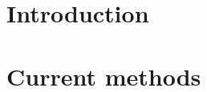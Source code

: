 \documentclass[review]{elsarticle}
\begin{document}
\newcommand{\RadioCoeffCresponse}{r_\text{resp}}
\newcommand{\RadioCoeffTexp}{r_\text{expo}}
\newcommand{\RadioConstant}{r_\text{const}}
\newcommand{\NormalizedMirrorResponse}{R}
\newcommand{\StarIntensity}{s}
\newcommand{\MirrorReflectionIntensity}{m}
\newcommand{\RelativePointing}{\Theta}
\newcommand{\texp}{T_\text{expo}}
\newcommand{\iflux}{I_\text{pix}}
\newcommand{\cresponse}{C_\text{pix}}
\newcommand{\geom}{\alpha}
\newcommand{\FigCapLabSca}[4]{
    \begin{figure}[H]
        \begin{center}
            \texttt{[image: \#1]}
            \caption[]{#2}
            \label{#3}
        \end{center}
    \end{figure}
}
\newcommand{\FigCapLab}[3]{
    \FigCapLabSca{#1}{#2}{#3}{1.0}
}
\newcommand{\TwoFigsSideBySide}[2]{
    \begin{minipage}[t]{0.485\linewidth}
        \vspace{-0.5cm}
        \texttt{[image: \#1]}
    \end{minipage}
    \hfill
    \begin{minipage}[t]{0.485\linewidth}
        \vspace{-0.5cm}
        \texttt{[image: \#2]}
        \vspace{-1cm}
    \end{minipage}
}
\newcommand{\SideBySide}[2]{
    \newline
    \begin{minipage}[t]{0.485\linewidth}
        #1
        \end{minipage}
    \hfill
        \begin{minipage}[t]{0.485\linewidth}
        #2
    \end{minipage}\\
}
\section{Introduction}
%

\section{Current methods}
\end{document}

